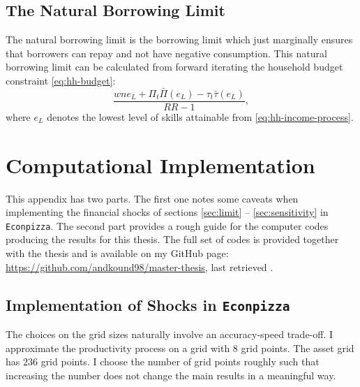 \documentclass[a4paper,12pt]{article} %
\numberwithin{equation}{section} %
\numberwithin{figure}{section}
\numberwithin{table}{section}
\begin{document}
\begin{refsection}
\begin{appendices}
\subsection{The Natural Borrowing Limit}
\label{sec:app-hh-borrowing}
The natural borrowing limit is the borrowing limit which just marginally ensures that borrowers can repay and not have negative consumption. This natural borrowing limit can be calculated from forward iterating the household budget constraint \eqref{eq:hh-budget}:
\begin{equation*}
    \frac{wne_{L} + \Pi_t \bar{\Pi} (e_{L}) - \tau_t \bar{\tau} (e_{L})}{RR - 1},
\end{equation*}
where $e_L$ denotes the lowest level of skills attainable from \eqref{eq:hh-income-process}.

\section{Computational Implementation}
\label{sec-app:codes}

This appendix has two parts. The first one notes some caveats when implementing the financial shocks of sections \ref{sec:limit} -- \ref{sec:sensitivity} in \texttt{Econpizza}. The second part provides a rough guide for the computer codes producing the results for this thesis. The full set of codes is provided together with the thesis and is available on my GitHub page: \url{https://github.com/andkound98/master-thesis}, last retrieved .

\subsection{Implementation of Shocks in \texttt{Econpizza}}
\label{sec-app:codes-ep}

The choices on the grid sizes naturally involve an accuracy-speed trade-off. I approximate the productivity process on a grid with $8$ grid points. The asset grid has $236$ grid points. I choose the number of grid points roughly such that increasing the number does not change the main results in a meaningful way.


\end{appendices}
\end{refsection}
\end{document}
